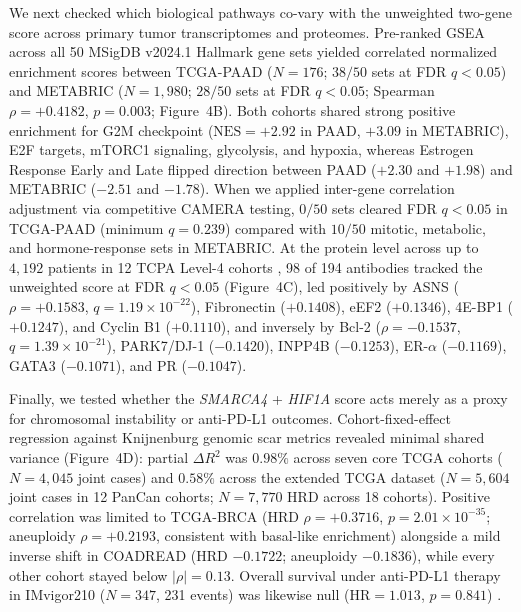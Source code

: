 \documentclass[10pt,twocolumn]{article}
\begin{document}
We next checked which biological pathways co-vary with the unweighted two-gene score across primary tumor transcriptomes and proteomes. Pre-ranked GSEA across all 50 MSigDB v2024.1 Hallmark gene sets \cite{liberzon2015} yielded correlated normalized enrichment scores between TCGA-PAAD ($N = 176$; $38/50$ sets at FDR $q < 0.05$) and METABRIC ($N = 1,980$; $28/50$ sets at FDR $q < 0.05$; Spearman $\rho = +0.4182$, $p = 0.003$; Figure~4B). Both cohorts shared strong positive enrichment for G2M checkpoint ($\text{NES} = +2.92$ in PAAD, $+3.09$ in METABRIC), E2F targets, mTORC1 signaling, glycolysis, and hypoxia, whereas Estrogen Response Early and Late flipped direction between PAAD ($+2.30$ and $+1.98$) and METABRIC ($-2.51$ and $-1.78$). When we applied inter-gene correlation adjustment via competitive CAMERA testing, $0/50$ sets cleared FDR $q < 0.05$ in TCGA-PAAD (minimum $q = 0.239$) compared with $10/50$ mitotic, metabolic, and hormone-response sets in METABRIC. At the protein level across up to $4,192$ patients in 12 TCPA Level-4 cohorts \cite{li2013,akbani2014}, 98 of 194 antibodies tracked the unweighted score at FDR $q < 0.05$ (Figure~4C), led positively by ASNS ($\rho = +0.1583$, $q = 1.19 \times 10^{-22}$), Fibronectin ($+0.1408$), eEF2 ($+0.1346$), 4E-BP1 ($+0.1247$), and Cyclin B1 ($+0.1110$), and inversely by Bcl-2 ($\rho = -0.1537$, $q = 1.39 \times 10^{-21}$), PARK7/DJ-1 ($-0.1420$), INPP4B ($-0.1253$), ER-$\alpha$ ($-0.1169$), GATA3 ($-0.1071$), and PR ($-0.1047$).

Finally, we tested whether the \textit{SMARCA4} + \textit{HIF1A} score acts merely as a proxy for chromosomal instability or anti-PD-L1 outcomes. Cohort-fixed-effect regression against Knijnenburg genomic scar metrics \cite{knijnenburg2018} revealed minimal shared variance (Figure~4D): partial $\Delta R^2$ was $0.98\%$ across seven core TCGA cohorts ($N = 4,045$ joint cases) and $0.58\%$ across the extended TCGA dataset ($N = 5,604$ joint cases in 12 PanCan cohorts; $N = 7,770$ HRD across 18 cohorts). Positive correlation was limited to TCGA-BRCA (HRD $\rho = +0.3716$, $p = 2.01 \times 10^{-35}$; aneuploidy $\rho = +0.2193$, consistent with basal-like enrichment) alongside a mild inverse shift in COADREAD (HRD $-0.1722$; aneuploidy $-0.1836$), while every other cohort stayed below $|\rho| = 0.13$. Overall survival under anti-PD-L1 therapy in IMvigor210 ($N = 347$, 231 events) was likewise null ($\text{HR} = 1.013$, $p = 0.841$) \cite{mariathasan2018}.
\end{document}
